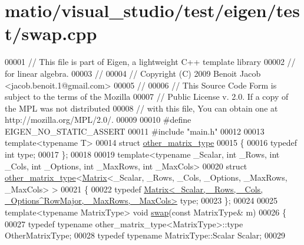 \hypertarget{matio_2visual__studio_2test_2eigen_2test_2swap_8cpp_source}{}\section{matio/visual\+\_\+studio/test/eigen/test/swap.cpp}
\label{matio_2visual__studio_2test_2eigen_2test_2swap_8cpp_source}

\begin{DoxyCode}
00001 \textcolor{comment}{// This file is part of Eigen, a lightweight C++ template library}
00002 \textcolor{comment}{// for linear algebra.}
00003 \textcolor{comment}{//}
00004 \textcolor{comment}{// Copyright (C) 2009 Benoit Jacob <jacob.benoit.1@gmail.com>}
00005 \textcolor{comment}{//}
00006 \textcolor{comment}{// This Source Code Form is subject to the terms of the Mozilla}
00007 \textcolor{comment}{// Public License v. 2.0. If a copy of the MPL was not distributed}
00008 \textcolor{comment}{// with this file, You can obtain one at http://mozilla.org/MPL/2.0/.}
00009 
00010 \textcolor{preprocessor}{#define EIGEN\_NO\_STATIC\_ASSERT}
00011 \textcolor{preprocessor}{#include "main.h"}
00012 
00013 \textcolor{keyword}{template}<\textcolor{keyword}{typename} T>
00014 \textcolor{keyword}{struct }\hyperlink{structother__matrix__type}{other\_matrix\_type}
00015 \{
00016   \textcolor{keyword}{typedef} \textcolor{keywordtype}{int} type;
00017 \};
00018 
00019 \textcolor{keyword}{template}<\textcolor{keyword}{typename} \_Scalar, \textcolor{keywordtype}{int} \_Rows, \textcolor{keywordtype}{int} \_Cols, \textcolor{keywordtype}{int} \_Options, \textcolor{keywordtype}{int} \_MaxRows, \textcolor{keywordtype}{int} \_MaxCols>
00020 \textcolor{keyword}{struct }\hyperlink{structother__matrix__type}{other\_matrix\_type}<\hyperlink{group___core___module_class_eigen_1_1_matrix}{Matrix}<\_Scalar, \_Rows, \_Cols, \_Options, \_MaxRows, \_MaxCols>
       >
00021 \{
00022   \textcolor{keyword}{typedef} \hyperlink{group___core___module_class_eigen_1_1_matrix}{Matrix<\_Scalar, \_Rows, \_Cols, \_Options^RowMajor, \_MaxRows, \_MaxCols>}
       type;
00023 \};
00024 
00025 \textcolor{keyword}{template}<\textcolor{keyword}{typename} MatrixType> \textcolor{keywordtype}{void} \hyperlink{endian_8c_a3ca5ecd34b04d6a243c054ac3a57f68d}{swap}(\textcolor{keyword}{const} MatrixType& m)
00026 \{
00027   \textcolor{keyword}{typedef} \textcolor{keyword}{typename} other\_matrix\_type<MatrixType>::type OtherMatrixType;
00028   \textcolor{keyword}{typedef} \textcolor{keyword}{typename} MatrixType::Scalar Scalar;
00029 

\end{DoxyCode}
